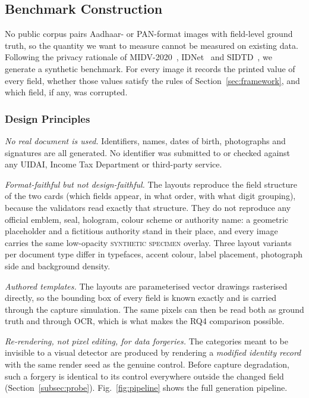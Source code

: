 \documentclass[12pt]{article}
\begin{document}
\subsection{Benchmark Construction}
\label{sec:dataset}

No public corpus pairs Aadhaar- or PAN-format images with field-level
ground truth, so the quantity we want to measure cannot be measured on
existing data. Following the privacy rationale of
MIDV-2020~\cite{midv}, IDNet~\cite{idnet} and SIDTD~\cite{sidtd}, we
generate a synthetic benchmark. For every image it records the printed
value of every field, whether those values satisfy the rules of
Section~\ref{sec:framework}, and which field, if any, was corrupted.

\subsubsection{Design Principles}
\label{subsec:principles}

\emph{No real document is used.} Identifiers, names, dates of birth,
photographs and signatures are all generated. No identifier was
submitted to or checked against any UIDAI, Income Tax Department or
third-party service.

\emph{Format-faithful but not design-faithful.} The layouts reproduce
the field structure of the two cards (which fields appear, in what
order, with what digit grouping), because the validators read exactly
that structure. They do not reproduce any official emblem, seal, hologram, colour
scheme or authority name: a geometric placeholder and a fictitious
authority stand in their place, and every image carries the same
low-opacity \textsc{synthetic specimen} overlay. Three layout variants
per document type differ in typefaces, accent colour, label placement,
photograph side and background density.

\emph{Authored templates.} The layouts are parameterised vector
drawings rasterised directly, so the bounding box of every field is
known exactly and is carried through the capture simulation. The same
pixels can then be read both as ground truth and through OCR, which is
what makes the RQ4 comparison possible.

\emph{Re-rendering, not pixel editing, for data forgeries.} The
categories meant to be invisible to a visual detector are produced by
rendering a \emph{modified identity record} with the same render seed
as the genuine control. Before capture degradation, such a forgery is
identical to its control everywhere outside the changed field
(Section~\ref{subsec:probe}). Fig.~\ref{fig:pipeline} shows the full
generation pipeline.
\end{document}
